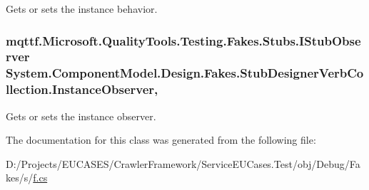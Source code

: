 Gets or sets the instance behavior.

\hypertarget{class_system_1_1_component_model_1_1_design_1_1_fakes_1_1_stub_designer_verb_collection_a0b02ed949f7e2e5ee430402625fd7987}{
\subsubsection[{Instance\-Observer}]{\setlength{\rightskip}{0pt plus 5cm}mqttf.\-Microsoft.\-Quality\-Tools.\-Testing.\-Fakes.\-Stubs.\-I\-Stub\-Observer System.\-Component\-Model.\-Design.\-Fakes.\-Stub\-Designer\-Verb\-Collection.\-Instance\-Observer\hspace{0.3cm}{\ttfamily [get]}, {\ttfamily [set]}}}\label{class_system_1_1_component_model_1_1_design_1_1_fakes_1_1_stub_designer_verb_collection_a0b02ed949f7e2e5ee430402625fd7987}


Gets or sets the instance observer.



The documentation for this class was generated from the following file\-:\begin{DoxyCompactItemize}
\item 
D\-:/\-Projects/\-E\-U\-C\-A\-S\-E\-S/\-Crawler\-Framework/\-Service\-E\-U\-Cases.\-Test/obj/\-Debug/\-Fakes/s/\hyperlink{s_2f_8cs}{f.\-cs}\end{DoxyCompactItemize}
